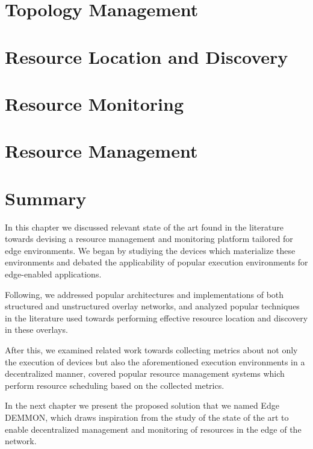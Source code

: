 \section{Topology Management} \label{sec:topology_management} 

\section{Resource Location and Discovery} \label{sec:res_location} 

\section{Resource Monitoring} \label{sec:res_monitoring} 

\section{Resource Management} \label{sec:res_management} 

\section{Summary}

In this chapter we discussed relevant state of the art found in the literature towards devising a resource management and monitoring platform tailored for edge environments. We began by studiying the devices which materialize these environments and debated the applicability of popular execution environments for edge-enabled applications.

Following, we addressed popular architectures and implementations of both structured and unstructured overlay networks, and analyzed popular techniques in the literature used towards performing effective resource location and discovery in these overlays. 

After this, we examined related work towards collecting metrics about not only the execution of devices but also the aforementioned execution environments in a decentralized manner, covered popular resource management systems which perform resource scheduling based on the collected metrics.

In the next chapter we present the proposed solution that we named Edge DEMMON, which draws inspiration from the study of the state of the art to enable decentralized management and monitoring of resources in the edge of the network.